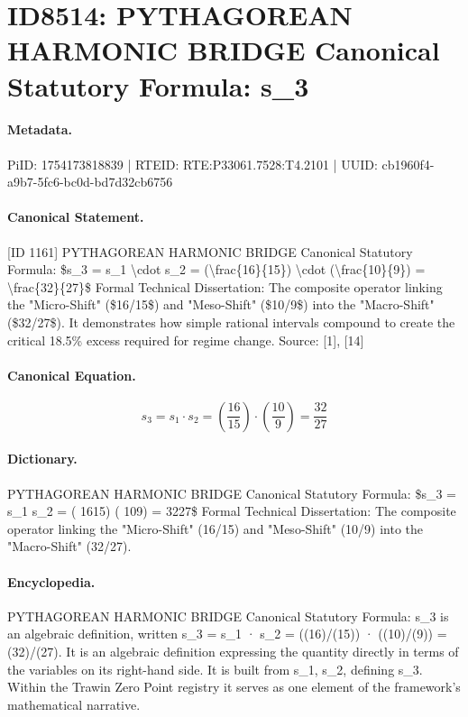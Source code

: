 \section*{ID8514: PYTHAGOREAN HARMONIC BRIDGE Canonical Statutory Formula: s\_3}
\paragraph{Metadata.}
PiID: 1754173818839 | RTEID: RTE:P33061.7528:T4.2101 | UUID: cb1960f4-a9b7-5fc6-bc0d-bd7d32cb6756

\paragraph{Canonical Statement.}
[ID 1161] PYTHAGOREAN HARMONIC BRIDGE Canonical Statutory Formula: \$s\_3 = s\_1 \textbackslash{}cdot s\_2 = (\textbackslash{}frac\{16\}\{15\}) \textbackslash{}cdot (\textbackslash{}frac\{10\}\{9\}) = \textbackslash{}frac\{32\}\{27\}\$ Formal Technical Dissertation: The composite operator linking the "Micro-Shift" (\$16/15\$) and "Meso-Shift" (\$10/9\$) into the "Macro-Shift" (\$32/27\$). It demonstrates how simple rational intervals compound to create the critical 18.5\% excess required for regime change. Source: [1], [14]

\paragraph{Canonical Equation.}
\[
s_3 = s_1 \cdot s_2 = (\frac{16}{15}) \cdot (\frac{10}{9}) = \frac{32}{27}
\]

\paragraph{Dictionary.}
PYTHAGOREAN HARMONIC BRIDGE Canonical Statutory Formula: \$s\_3 = s\_1 s\_2 = ( 1615) ( 109) = 3227\$ Formal Technical Dissertation: The composite operator linking the "Micro-Shift" (16/15) and "Meso-Shift" (10/9) into the "Macro-Shift" (32/27).

\paragraph{Encyclopedia.}
PYTHAGOREAN HARMONIC BRIDGE Canonical Statutory Formula: s\_3 is an algebraic definition, written s\_3 = s\_1 · s\_2 = ((16)/(15)) · ((10)/(9)) = (32)/(27). It is an algebraic definition expressing the quantity directly in terms of the variables on its right-hand side. It is built from s\_1, s\_2, defining s\_3. Within the Trawin Zero Point registry it serves as one element of the framework's mathematical narrative.
